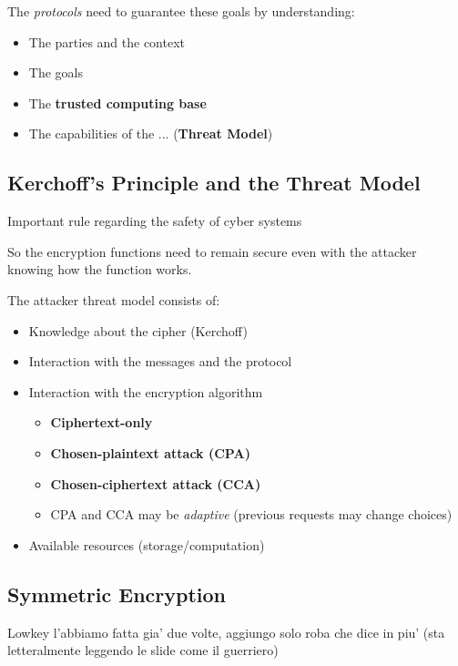 The \textit{protocols} need to guarantee these goals by understanding:
\begin{itemize}
\item The parties and the context
  \item The goals
    \item The \textbf{trusted computing base}
    \item The capabilities of the ... (\textbf{Threat Model})
\end{itemize}

\subsection{Kerchoff's Principle and the Threat Model}
Important rule regarding the safety of cyber systems


So the encryption functions need to remain secure even with the attacker knowing how the function works.

The attacker threat model consists of:
\begin{itemize}
  \item Knowledge about the cipher (Kerchoff)
\item Interaction with the messages and the protocol
\item Interaction with the encryption algorithm
  \begin{itemize}
  \item \textbf{Ciphertext-only}
  \item \textbf{Chosen-plaintext attack (CPA)}
  \item \textbf{Chosen-ciphertext attack (CCA)}
  \item CPA and CCA may be \textit{adaptive} (previous requests may change choices)
  \end{itemize}
\item Available resources (storage/computation)
\end{itemize}

\subsection{Symmetric Encryption}
Lowkey l'abbiamo fatta gia' due volte, aggiungo solo roba che dice in piu' (sta letteralmente leggendo le slide come il guerriero)

